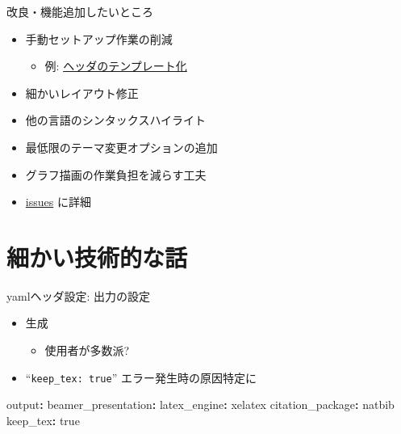 \documentclass[
  12pt,
  ignorenonframetext,
]{beamer}
\newenvironment{Shaded}{\begin{snugshade}}{\end{snugshade}}
\newcommand{\AttributeTok}[1]{\textcolor[rgb]{0.77,0.63,0.00}{#1}}
\newcommand{\CharTok}[1]{\textcolor[rgb]{0.31,0.60,0.02}{#1}}
\newcommand{\FunctionTok}[1]{\textcolor[rgb]{0.00,0.00,0.00}{#1}}
\newcommand{\KeywordTok}[1]{\textcolor[rgb]{0.13,0.29,0.53}{\textbf{#1}}}
\providecommand{\tightlist}{%
  \setlength{\itemsep}{0pt}\setlength{\parskip}{0pt}}
\begin{document}
\begin{frame}{改良・機能追加したいところ}
\protect\hypertarget{ux6539ux826fux6a5fux80fdux8ffdux52a0ux3057ux305fux3044ux3068ux3053ux308d}{}

\begin{itemize}
\tightlist
\item
  手動セットアップ作業の削減

  \begin{itemize}
  \tightlist
  \item
    例:
    \href{https://atusy.github.io/tokyor85-original-rmd-format}{ヘッダのテンプレート化}
  \end{itemize}
\item
  細かいレイアウト修正
\item
  他の言語のシンタックスハイライト
\item
  最低限のテーマ変更オプションの追加
\item
  グラフ描画の作業負担を減らす工夫
\item
  \href{https://github.com/Gedevan-Aleksizde/my_latex_templates/labels/enhancement}{issues}
  に詳細
\end{itemize}

\end{frame}

\hypertarget{ux7d30ux304bux3044ux6280ux8853ux7684ux306aux8a71}{%
\section{細かい技術的な話}\label{ux7d30ux304bux3044ux6280ux8853ux7684ux306aux8a71}}

\begin{frame}[fragile]{yamlヘッダ設定: 出力の設定}
\protect\hypertarget{yamlux30d8ux30c3ux30c0ux8a2dux5b9a-ux51faux529bux306eux8a2dux5b9a}{}

\begin{itemize}
\tightlist
\item
  \XeLaTeX 生成

  \begin{itemize}
  \tightlist
  \item
    \LuaLaTeX 使用者が多数派?
  \end{itemize}
\item
  ``\texttt{keep\_tex:\ true}'' エラー発生時の原因特定に
\end{itemize}

\begin{Shaded}
\begin{Highlighting}[]
\FunctionTok{output}\KeywordTok{:}
\AttributeTok{  }\FunctionTok{beamer_presentation}\KeywordTok{:}
\AttributeTok{    }\FunctionTok{latex_engine}\KeywordTok{:}\AttributeTok{ xelatex}
\AttributeTok{    }\FunctionTok{citation_package}\KeywordTok{:}\AttributeTok{ natbib}
\AttributeTok{    }\FunctionTok{keep_tex}\KeywordTok{:}\AttributeTok{ }\CharTok{true}
\end{Highlighting}
\end{Shaded}

\end{frame}
\end{document}
